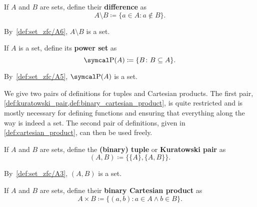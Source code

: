 \begin{definition}\label{def:set_difference}\cite[27]{Enderton1977}
  If \( A \) and \( B \) are sets, define their \textbf{difference} as
  \begin{equation*}
    A \setminus B \coloneqq \{ a \in A \colon a \not\in B \}.
  \end{equation*}

  By~\ref{def:set_zfc/A6}, \( A \setminus B \) is a set.
\end{definition}

\begin{definition}\label{def:power_set}\cite[19]{Enderton1977}
  If \( A \) is a set, define its \textbf{power set} as
  \begin{equation*}
    \Power(A) \coloneqq \{ B \colon B \subseteq A \}.
  \end{equation*}

  By~\ref{def:set_zfc/A5}, \( \Power(A) \) is a set.
\end{definition}

\begin{note}
  We give two pairs of definitions for tuples and Cartesian products. The first pair, \cref{def:kuratowski_pair,def:binary_cartesian_product}, is quite restricted and is mostly necessary for defining functions and ensuring that everything along the way is indeed a set. The second pair of definitions, given in \cref{def:cartesian_product}, can then be used freely.
\end{note}

\begin{definition}\label{def:kuratowski_pair}\cite[36]{Enderton1977}
  If \( A \) and \( B \) are sets, define the \textbf{(binary) tuple} or \textbf{Kuratowski pair} as
  \begin{equation*}
    (A, B) \coloneqq \{ \{ A \}, \{ A, B \} \}.
  \end{equation*}

  By~\ref{def:set_zfc/A3}, \( (A, B) \) is a set.
\end{definition}

\begin{definition}\label{def:binary_cartesian_product}\cite[37]{Enderton1977}
  If \( A \) and \( B \) are sets, define their \textbf{binary Cartesian product} as
  \begin{equation*}
    A \times B \coloneqq \{ (a, b) \colon a \in A \land b \in B \}.
  \end{equation*}
\end{definition}

